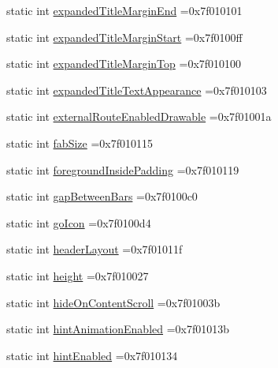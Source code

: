 \begin{DoxyCompactItemize}
static int \hyperlink{classandroid_1_1support_1_1v7_1_1mediarouter_1_1R_1_1attr_ae7382f06326cf8a453209c07b9d50216}{expanded\+Title\+Margin\+End} =0x7f010101
\item 
static int \hyperlink{classandroid_1_1support_1_1v7_1_1mediarouter_1_1R_1_1attr_a96b4e59b005c6dd2be8bb1e64996185b}{expanded\+Title\+Margin\+Start} =0x7f0100ff
\item 
static int \hyperlink{classandroid_1_1support_1_1v7_1_1mediarouter_1_1R_1_1attr_a929badf3e20735613d086893ef78582d}{expanded\+Title\+Margin\+Top} =0x7f010100
\item 
static int \hyperlink{classandroid_1_1support_1_1v7_1_1mediarouter_1_1R_1_1attr_a385a00e64804618af33beb484b83c09c}{expanded\+Title\+Text\+Appearance} =0x7f010103
\item 
static int \hyperlink{classandroid_1_1support_1_1v7_1_1mediarouter_1_1R_1_1attr_ad05965c94dd069d89708ec50e1b52c53}{external\+Route\+Enabled\+Drawable} =0x7f01001a
\item 
static int \hyperlink{classandroid_1_1support_1_1v7_1_1mediarouter_1_1R_1_1attr_a0ede172ed4b9ba8bf23af12e26f093fe}{fab\+Size} =0x7f010115
\item 
static int \hyperlink{classandroid_1_1support_1_1v7_1_1mediarouter_1_1R_1_1attr_a129677eb00ce5dab4f2c98640e902998}{foreground\+Inside\+Padding} =0x7f010119
\item 
static int \hyperlink{classandroid_1_1support_1_1v7_1_1mediarouter_1_1R_1_1attr_a21045eca06d08dbc355554d3ab7fc8ab}{gap\+Between\+Bars} =0x7f0100c0
\item 
static int \hyperlink{classandroid_1_1support_1_1v7_1_1mediarouter_1_1R_1_1attr_a0f1539bfc582bd52fb633901a0844110}{go\+Icon} =0x7f0100d4
\item 
static int \hyperlink{classandroid_1_1support_1_1v7_1_1mediarouter_1_1R_1_1attr_a4be7297f22c11f2c656c89cc78eca215}{header\+Layout} =0x7f01011f
\item 
static int \hyperlink{classandroid_1_1support_1_1v7_1_1mediarouter_1_1R_1_1attr_ac2d0839f9c7aaf7042df6d5beda43613}{height} =0x7f010027
\item 
static int \hyperlink{classandroid_1_1support_1_1v7_1_1mediarouter_1_1R_1_1attr_a3648c455c32e39588f76f8d24b3a6400}{hide\+On\+Content\+Scroll} =0x7f01003b
\item 
static int \hyperlink{classandroid_1_1support_1_1v7_1_1mediarouter_1_1R_1_1attr_a379b98c861daa2964b42107fb3a190fd}{hint\+Animation\+Enabled} =0x7f01013b
\item 
static int \hyperlink{classandroid_1_1support_1_1v7_1_1mediarouter_1_1R_1_1attr_adb3d7bb0e53eda2fa97659c87c5fb8d1}{hint\+Enabled} =0x7f010134

\end{DoxyCompactItemize}

